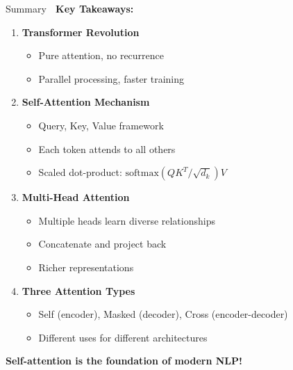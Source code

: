 \documentclass[aspectratio=169]{beamer}
\begin{document}
\begin{frame}[shrink=10]{Summary 🎯}
\textbf{Key Takeaways:}

\vspace{1em}

\begin{enumerate}\setlength{\itemsep}{0pt}
    \item \textbf{Transformer Revolution}
    \begin{itemize}\setlength{\itemsep}{0pt}
        \item Pure attention, no recurrence
        \item Parallel processing, faster training
    \end{itemize}

    \item \textbf{Self-Attention Mechanism}
    \begin{itemize}\setlength{\itemsep}{0pt}
        \item Query, Key, Value framework
        \item Each token attends to all others
        \item Scaled dot-product: $\text{softmax}(QK^T/\sqrt{d_k})V$
    \end{itemize}

    \item \textbf{Multi-Head Attention}
    \begin{itemize}\setlength{\itemsep}{0pt}
        \item Multiple heads learn diverse relationships
        \item Concatenate and project back
        \item Richer representations
    \end{itemize}

    \item \textbf{Three Attention Types}
    \begin{itemize}\setlength{\itemsep}{0pt}
        \item Self (encoder), Masked (decoder), Cross (encoder-decoder)
        \item Different uses for different architectures
    \end{itemize}
\end{enumerate}

\vspace{0.5em}
\textbf{Self-attention is the foundation of modern NLP!}
\end{frame}
\end{document}

